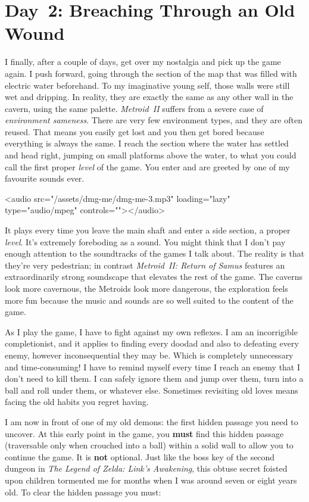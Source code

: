 \documentclass{book}
\begin{document}
\FloatBarrier\needspace{10mm}\section*{Day 2: Breaching Through an Old Wound}\nopagebreak[4]

I finally, after a couple of days, get over my nostalgia and pick up the game again. I push forward, going through the section of the map that was filled with electric water beforehand. To my imaginative young self, those walls were still wet and dripping. In reality, they are exactly the same as any other wall in the cavern, using the same palette. \emph{Metroid II} suffers from a severe case of \emph{environment sameness}. There are very few environment types, and they are often reused. That means you easily get lost and you then get bored because everything is always the same. I reach the section where the water has settled and head right, jumping on small platforms above the water, to what you could call the first proper \emph{level} of the game. You enter and are greeted by one of my favourite sounds ever.

<audio src="/assets/dmg-me/dmg-me-3.mp3" loading="lazy" type="audio/mpeg" controls=""></audio>

It plays every time you leave the main shaft and enter a side section, a proper \emph{level}. It’s extremely foreboding as a sound. You might think that I don’t pay enough attention to the soundtracks of the games I talk about. The reality is that they’re very pedestrian; in contrast \emph{Metroid II: Return of Samus} features an extraordinarily strong soundscape that elevates the rest of the game. The caverns look more cavernous, the Metroids look more dangerous, the exploration feels more fun because the music and sounds are so well suited to the content of the game.

As I play the game, I have to fight against my own reflexes. I am an incorrigible completionist, and it applies to finding every doodad and also to defeating every enemy, however inconsequential they may be. Which is completely unnecessary and time-consuming! I have to remind myself every time I reach an enemy that I don’t need to kill them. I can safely ignore them and jump over them, turn into a ball and roll under them, or whatever else. Sometimes revisiting old loves means facing the old habits you regret having.

I am now in front of one of my old demons: the first hidden passage you need to uncover. At this early point in the game, you \textbf{must} find this hidden passage (traversable only when crouched into a ball) within a solid wall to allow you to continue the game. It is \textbf{not} optional. Just like the boss key of the second dungeon in \emph{The Legend of Zelda: Link’s Awakening}, this obtuse secret foisted upon children tormented me for months when I was around seven or eight years old. To clear the hidden passage you must:
\end{document}
